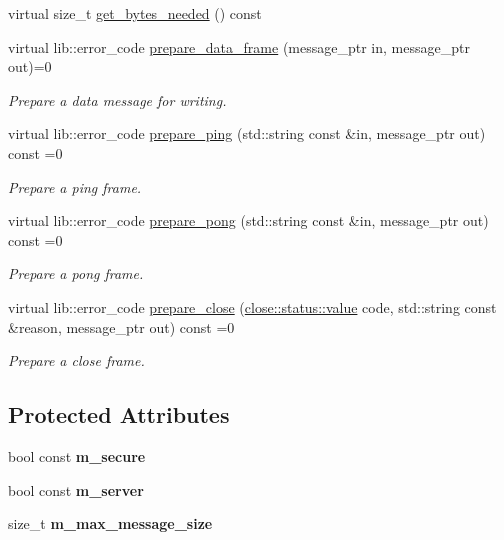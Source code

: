 \begin{DoxyCompactItemize}
virtual size\+\_\+t \mbox{\hyperlink{classwebsocketpp_1_1processor_1_1processor_a141bc4565dc27e047df1251f117543b4}{get\+\_\+bytes\+\_\+needed}} () const
\item 
virtual lib\+::error\+\_\+code \mbox{\hyperlink{classwebsocketpp_1_1processor_1_1processor_a1345763249867d742390aa8e2076cb70}{prepare\+\_\+data\+\_\+frame}} (message\+\_\+ptr in, message\+\_\+ptr out)=0
\begin{DoxyCompactList}\small\item\em Prepare a data message for writing. \end{DoxyCompactList}\item 
virtual lib\+::error\+\_\+code \mbox{\hyperlink{classwebsocketpp_1_1processor_1_1processor_aae3f34ae169c9b5e588cf268e310d6e2}{prepare\+\_\+ping}} (std\+::string const \&in, message\+\_\+ptr out) const =0
\begin{DoxyCompactList}\small\item\em Prepare a ping frame. \end{DoxyCompactList}\item 
virtual lib\+::error\+\_\+code \mbox{\hyperlink{classwebsocketpp_1_1processor_1_1processor_afc8206bfe447a461d0e30a969b0af859}{prepare\+\_\+pong}} (std\+::string const \&in, message\+\_\+ptr out) const =0
\begin{DoxyCompactList}\small\item\em Prepare a pong frame. \end{DoxyCompactList}\item 
virtual lib\+::error\+\_\+code \mbox{\hyperlink{classwebsocketpp_1_1processor_1_1processor_a189c400df6f5e325291794cb62053911}{prepare\+\_\+close}} (\mbox{\hyperlink{namespacewebsocketpp_1_1close_1_1status_a8614a5c4733d708e2d2a32191c5bef84}{close\+::status\+::value}} code, std\+::string const \&reason, message\+\_\+ptr out) const =0
\begin{DoxyCompactList}\small\item\em Prepare a close frame. \end{DoxyCompactList}\end{DoxyCompactItemize}
\subsection*{Protected Attributes}
\begin{DoxyCompactItemize}
\item 
\mbox{\label{classwebsocketpp_1_1processor_1_1processor_aebab411b1ca4d8ab32ee8c13afcf9274}} 
bool const {\bfseries m\+\_\+secure}
\item 
\mbox{\label{classwebsocketpp_1_1processor_1_1processor_a584edc3698f98e6eb85ab280f491ac9d}} 
bool const {\bfseries m\+\_\+server}
\item 
\mbox{\label{classwebsocketpp_1_1processor_1_1processor_a74984af956fccae7e045743cf8ac23b4}} 
size\+\_\+t {\bfseries m\+\_\+max\+\_\+message\+\_\+size}
\end{DoxyCompactItemize}



